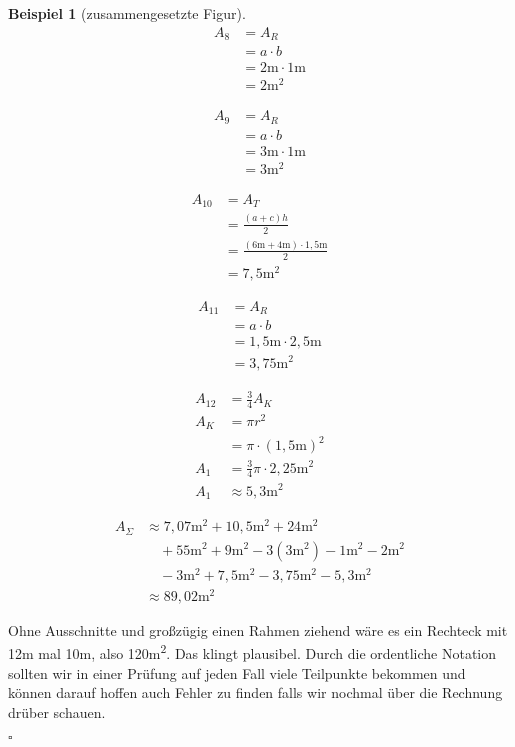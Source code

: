 \documentclass[a4paper]{book}%
\newcommand{\proofsquare}{
    \begin{flushright}
      $\square$
    \end{flushright}\xspace
}
\theoremstyle{definition}
\newtheorem{beispiel}{Beispiel}
\begin{document}
\begin{beispiel}[zusammengesetzte Figur]
    \begin{align}
      A_8 &= A_R \\
       &= a \cdot b\\
       &= 2\text{m} \cdot 1\text{m}\\
       &= 2\text{m}^2
    \end{align}

    \begin{align}
      A_9 &= A_R \\
       &= a \cdot b\\
       &= 3\text{m} \cdot 1\text{m}\\
       &= 3\text{m}^2
    \end{align}

    \begin{align}
      A_{10} &= A_T \\
       &= \frac{(a+c)h}{2}\\
       &= \frac{(6\text{m}+4\text{m}) \cdot 1,5\text{m}}{2}\\
       &= 7,5\text{m}^2
    \end{align}

    \begin{align}
      A_{11} &= A_R \\
       &= a \cdot b\\
       &= 1,5\text{m} \cdot 2,5\text{m}\\
       &= 3,75\text{m}^2
    \end{align}

    \begin{align}
      A_{12} &= \frac{3}{4} A_K \\
       A_K &= \pi r^2 \\
       &= \pi \cdot (1,5\text{m})^2\\
       A_1 &= \frac{3}{4} \pi \cdot 2,25\text{m}^2\\
       A_1 & \approx 5,3\text{m}^2
    \end{align}

    \begin{align}
      A_{\Sigma} & \approx 7,07\text{m}^2 + 10,5\text{m}^2 + 24\text{m}^2\\
       &\quad + 55\text{m}^2 + 9\text{m}^2 - 3(3\text{m}^2) - 1\text{m}^2 - 2\text{m}^2\\
       &\quad - 3\text{m}^2 + 7,5\text{m}^2 - 3,75\text{m}^2 - 5,3\text{m}^2\\
       & \approx 89,02\text{m}^2
    \end{align}

    Ohne Ausschnitte und großzügig einen Rahmen ziehend wäre es ein Rechteck mit 12m mal 10m, also 120m\textsuperscript{2}. Das klingt plausibel. Durch die ordentliche Notation sollten wir in einer Prüfung auf jeden Fall viele Teilpunkte bekommen und können darauf hoffen auch Fehler zu finden falls wir nochmal über die Rechnung drüber schauen.\proofsquare
\end{beispiel}
\end{document}
